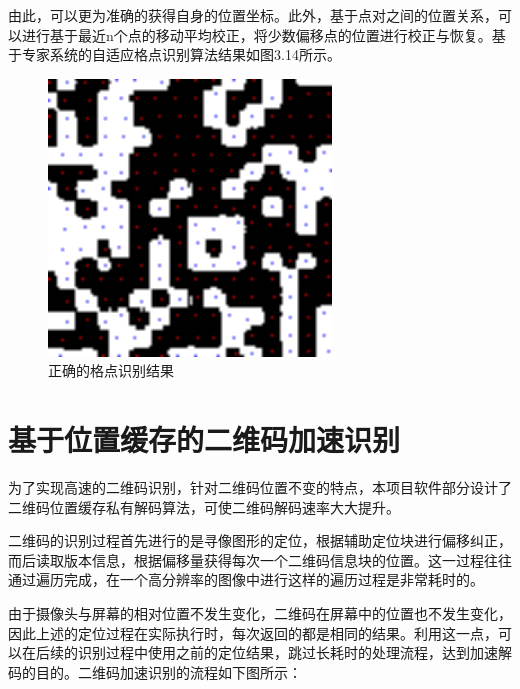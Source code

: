 由此，可以更为准确的获得自身的位置坐标。此外，基于点对之间的位置关系，可以进行基于最近n个点的移动平均校正，将少数偏移点的位置进行校正与恢复。基于专家系统的自适应格点识别算法结果如图3.14所示。

\begin{figure}[!htbp]
\centering
\includegraphics[scale=1]{figures/QR_Prf/图片11.png}
\caption{正确的格点识别结果}
\end{figure}

\section{基于位置缓存的二维码加速识别}

为了实现高速的二维码识别，针对二维码位置不变的特点，本项目软件部分设计了二维码位置缓存私有解码算法，可使二维码解码速率大大提升。

二维码的识别过程首先进行的是寻像图形的定位，根据辅助定位块进行偏移纠正，而后读取版本信息，根据偏移量获得每次一个二维码信息块的位置。这一过程往往通过遍历完成，在一个高分辨率的图像中进行这样的遍历过程是非常耗时的。

由于摄像头与屏幕的相对位置不发生变化，二维码在屏幕中的位置也不发生变化，因此上述的定位过程在实际执行时，每次返回的都是相同的结果。利用这一点，可以在后续的识别过程中使用之前的定位结果，跳过长耗时的处理流程，达到加速解码的目的。二维码加速识别的流程如下图所示：


